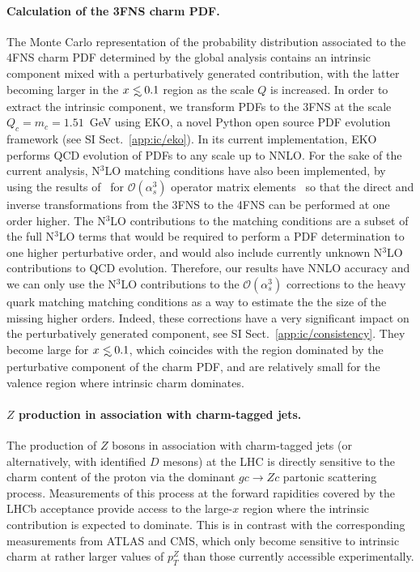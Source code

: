 \documentclass[11pt,a4paper]{article}
\def\lsim{\mathrel{\rlap{\lower4pt\hbox{\hskip1pt$\sim$}}
    \raise1pt\hbox{$<$}}}         %
\begin{document}
\paragraph{Calculation of the 3FNS charm PDF.}
%
The Monte Carlo representation of the probability distribution associated to
the 4FNS charm PDF determined by the global
analysis contains an intrinsic component mixed with a perturbatively
generated contribution, with the latter
becoming larger in the $x\lsim 0.1$ region as the scale $Q$ is increased.
%
In order to extract the intrinsic component, 
we transform PDFs to the 3FNS at the scale $Q_c=m_c=1.51$~GeV using
{\sc\small EKO}, a novel {\sc\small Python} open source
PDF evolution framework (see  SI Sect.~\ref{app:ic/eko}).
%
In its current implementation, {\sc\small EKO} performs  QCD 
evolution of PDFs to any scale
up to NNLO. For
the sake of the current analysis, N$^3$LO matching conditions have also
been implemented, by 
using  the results
of~\cite{Bierenbaum:2009zt,Bierenbaum:2009mv,Ablinger:2010ty,Ablinger:2014vwa,Ablinger:2014uka,Behring:2014eya,Ablinger_2014,Ablinger:2014nga,Blumlein:2017wxd}
for $\mathcal{O}(\alpha_s^3)$ operator matrix elements~
so that the direct and inverse transformations from the 3FNS to the
4FNS can be performed at one order
higher.
%
The N$^3$LO contributions to the matching conditions are a subset of
the full N$^3$LO terms that would be required to perform a PDF determination
 to one higher perturbative order, and would
also include currently unknown
N$^3$LO contributions to QCD evolution. Therefore, our results have 
NNLO accuracy and we can only use the  N$^3$LO contributions to the
 $\mathcal{O}(\alpha_s^3)$ corrections to the
heavy quark matching
matching conditions as a way to estimate the 
the size of the missing higher orders. 
Indeed, these corrections have a very 
significant impact on the
perturbatively generated component, see SI Sect.~\ref{app:ic/consistency}.
%
They become large for $x \lsim 0.1$, which coincides with the region
dominated by the perturbative component of the charm PDF,
  and are relatively small for the valence region
  where intrinsic charm dominates.
  
\paragraph{$Z$ production in association with charm-tagged jets.}
%
The production of $Z$ bosons in association with charm-tagged jets (or alternatively,
with identified $D$ mesons) at the LHC is directly sensitive to the charm content
of the proton via the dominant $gc \to Zc$ partonic scattering process.
%
Measurements of this process at  the forward rapidities covered by the
LHCb acceptance provide access to the large-$x$ region where the intrinsic 
contribution is expected to dominate.
%
This is in contrast with the corresponding measurements from ATLAS and CMS,
which only become sensitive to intrinsic charm
at rather larger values of $p_T^Z$ than those
currently accessible experimentally.
\end{document}
